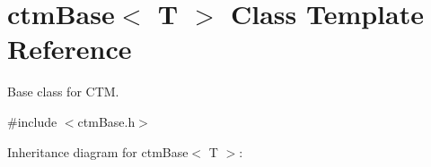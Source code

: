 \hypertarget{classctmBase}{}\section{ctm\+Base$<$ T $>$ Class Template Reference}
\label{classctmBase}


Base class for C\+TM.  




{\ttfamily \#include $<$ctm\+Base.\+h$>$}



Inheritance diagram for ctm\+Base$<$ T $>$\+:
